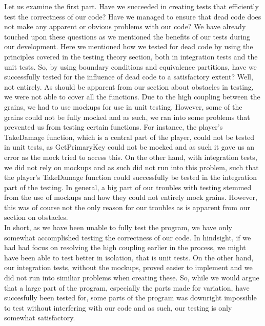 Let us examine the first part. Have we succeeded in creating tests that efficiently test the correctness of our code? Have we managed to ensure that dead code does not make any apparent or obvious problems with our code? We have already touched upon these questions as we mentioned the benefits of our tests during our development. Here we mentioned how we tested for dead code by using the principles covered in the testing theory section, both in integration tests and the unit tests. So, by using boundary conditions and equivalence partitions, have we successfully tested for the influence of dead code to a satisfactory extent? Well, not entirely. As should be apparent from our section about obstacles in testing, we were not able to cover all the functions. Due to the high coupling between the grains, we had to use mockups for use in unit testing. However, some of the grains could not be fully mocked and as such, we ran into some problems that prevented us from testing certain functions. For instance, the player's TakeDamage function, which is a central part of the player, could not be tested in unit tests, as GetPrimaryKey could not be mocked and as such it gave us an error as the mock tried to access this. On the other hand, with integration tests, we did not rely on mockups and as such did not run into this problem, such that the player's TakeDamage function could successfully be tested in the integration part of the testing. In general, a big part of our troubles with testing stemmed from the use of mockups and how they could not entirely mock grains. However, this was of course not the only reason for our troubles as is apparent from our section on obstacles. \\
In short, as we have been unable to fully test the program, we have only somewhat accomplished testing the correctness of our code. In hindsight, if we had had focus on resolving the high coupling earlier in the process, we might have been able to test better in isolation, that is unit tests. On the other hand, our integration tests, without the mockups, proved easier to implement and we did not run into similiar problems when creating these. So, while we would argue that a large part of the program, especially the parts made for variation, have succesfully been tested for, some parts of the program was downright impossible to test without interfering with our code and as such, our testing is only somewhat satisfactory. \\
\\
